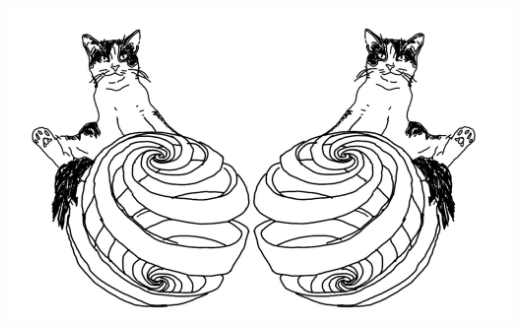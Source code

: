 \documentclass[10pt, a4paper, singlespacing]{report}
\begin{document}
\begin{center}
\vspace{5cm}
\includegraphics[scale=0.2]{bepqed.pdf}
\end{center}








\end{document}

